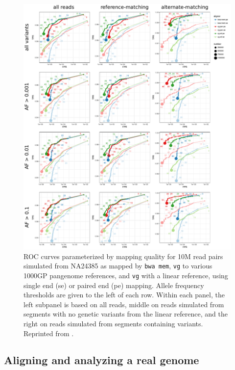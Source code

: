\documentclass[a4paper,12pt,numbered,oneside]{Classes/PhDThesisPSnPDF}
\begin{document}
\begin{figure}[htbp!] 
\centering    
\includegraphics[width=1.0\textwidth]{Chapter3/Figs/human-10M-results-7358a67_merge_panel_labeled.pdf}
\caption[Simulated reads from HG002 versus various human pangenome graphs.]{
  ROC curves parameterized by mapping quality for 10M read pairs simulated from NA24385 as mapped by {\tt bwa mem}, {\tt vg} to various 1000GP pangenome references, and {\tt vg} with a linear reference, using single end (se) or paired end (pe) mapping.
  Allele frequency thresholds are given to the left of each row.
  Within each panel, the left subpanel is based on all reads, middle on reads simulated from segments with no genetic variants from the linear reference, and the right on reads simulated from segments containing variants.
  Reprinted from \cite{garrison2018variation}.}
\label{fig:HG002_1000GP_sim}
\end{figure}

\subsection{Aligning and analyzing a real genome}
\end{document}
